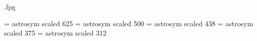 \def\fpgwrite{%
  \edef\act{%
    \write\fpgs{\noexpand\string\noexpand%
      \fpgdef{\the\figurenum}{\the\pagetoks}%
    }%
  }%
  \act
}


\newwrite\fpgs
\immediate\openout\fpgs \jobname.fpg



\def\itm{\myitem}
\def\part#1{{\em #1.\/}}
\let\verb=\verbtt

% astronomical symbols
\font\astrosymten   = \fontdir astrosym scaled 625
\font\astrosymeight = \fontdir astrosym scaled 500
\font\astrosymseven = \fontdir astrosym scaled 438
\font\astrosymsix   = \fontdir astrosym scaled 375
\font\astrosymfive  = \fontdir astrosym scaled 312

\def\hvezd{\ifmmode *\else $*$\fi}
\def\slunce{\ifmmode \odot\else $\odot$\fi}
\def\zeme{\ifmmode \oplus\else $\oplus$\fi}
\def\mesic{%
  {\mathchoice%
    {\hbox{\kern.02em\lower.1em \hbox{\astrosymten  \char210}}}%
    {\hbox{\kern.02em\lower.1em \hbox{\astrosymten  \char210}}}%
    {\hbox{\kern.01em\lower.1em \hbox{\astrosymeight\char210}}}%
    {\hbox{\kern.00em\lower.09em\hbox{\astrosymsix  \char210}}}%
  }%
}
\def\jupiter{%
  {\mathchoice%
    {\hbox{\hbox{\astrosymten  \char205}}}%
    {\hbox{\hbox{\astrosymten  \char205}}}%
    {\hbox{\hbox{\astrosymeight\char205}}}%
    {\hbox{\hbox{\astrosymsix  \char205}}}%
  }%
}

\def\verbttsmall#1{%
  \begingroup%
  \smallfonts%
  \baselineskip=9pt%
  \begingroup%
  \let\oldpar=\par\def\par{\oldpar\leavevmode}%
  \let\do\makeother \dospecials%
  \tt \obeyspaces \obeylines \parskip0pt \parindent0pt%
  \def\temp ##1#1{\leavevmode##1\endgroup\par\endgroup}\temp%
}

\def\parr{\hfil\break\indent}
\def\hateq{\mathrel{\widehat=}}

